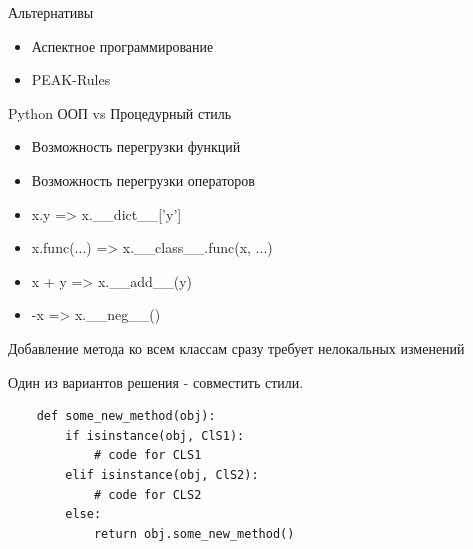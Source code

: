 \documentclass{article}
\begin{document}
\begin{center} Альтернативы \end{center}
\begin{itemize}
    \item Аспектное программирование
    \item PEAK-Rules
\end{itemize}
\newpage

\begin{center} Python ООП vs Процедурный стиль \end{center}
\begin{itemize}
    \item Возможность перегрузки функций
    \item Возможность перегрузки операторов
    \item x.y => x.\_\_dict\_\_['y']
    \item x.func(...) => x.\_\_class\_\_.func(x, ...)
    \item x + y => x.\_\_add\_\_(y)
    \item -x => x.\_\_neg\_\_()
\end{itemize}
\newpage

\begin{center} Добавление метода ко всем классам сразу требует нелокальных изменений \end{center}
Один из вариантов решения - совместить стили.
\begin{lstlisting}
    def some_new_method(obj):
        if isinstance(obj, ClS1):
            # code for CLS1
        elif isinstance(obj, ClS2):
            # code for CLS2
        else:
            return obj.some_new_method()
\end{lstlisting}
\newpage
\end{document}
